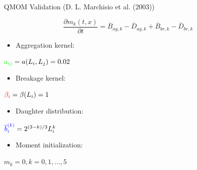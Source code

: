 \documentclass{beamer}
\begin{document}
\begin{frame}{QMOM Validation (D. L. Marchisio et al. (2003))}

\begin{equation*}
\frac{\partial m_k (t,x)}{\partial t} = \overline{B}_{ag,k}-\overline{D}_{ag,k} +\overline{B}_{br,k}-\overline{D}_{br,k}
\end{equation*}

\begin{itemize}
\item Aggregation kernel: 
\end{itemize}
\begin{center}
$\textcolor{green}{a_{ij}}=a(L_i,L_j)=0.02$
\end{center}

\begin{itemize}
\item Breakage kernel: 
\end{itemize}
\begin{center}
$\textcolor{red}{\beta_{i}}=\beta(L_i)=1$
\end{center}

\begin{itemize}
\item Daughter distribution: 
\end{itemize}
\begin{center}
$\textcolor{blue}{\overline{b}^{(k)}_i}=2^{(3-k)/3}L_i^k$
\end{center}

\begin{itemize}
\item Moment initialization: 
\end{itemize}
\begin{center}
$m_k=0, k=0,1,...,5$
\end{center}

\end{frame}
\end{document}

